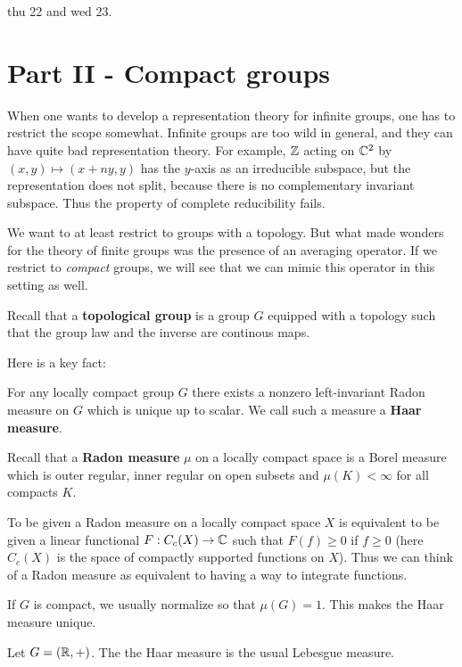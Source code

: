 \documentclass[11pt, english]{article}
\begin{document}
thu 22 and wed 23.


\newpage
\section{Part II - Compact groups}

When one wants to develop a representation theory for infinite groups, one has to restrict the scope somewhat. Infinite groups are too wild in general, and they can have quite bad representation theory. For example, $\mathbb{Z}$ acting on $\mathbb{C}^2$ by $(x,y) \mapsto (x+ny,y)$ has the $y$-axis as an irreducible subspace, but the representation does not split, because there is no complementary invariant subspace. Thus the property of complete reducibility fails. 

We want to at least restrict to groups with a topology. But what made wonders for the theory of finite groups was the presence of an averaging operator. If we restrict to \emph{compact} groups, we will see that we can mimic this operator in this setting as well.

Recall that a \textbf{topological group} is a group $G$ equipped with a topology such that the group law and the inverse are continous maps. 

Here is a key fact:
\begin{prop}
For any locally compact group $G$ there exists a nonzero left-invariant Radon measure on $G$ which is unique up to scalar. We call such a measure a \textbf{Haar measure}.  
\end{prop}

Recall that a \textbf{Radon measure} $\mu$ on a locally compact space is a Borel measure which is outer regular, inner regular on open subsets and $\mu(K) < \infty$ for all compacts $K$.

To be given a Radon measure on a locally compact space $X$ is equivalent to be given a linear functional $F:C_c(X) \to \mathbb{C}$ such that $F(f) \geq 0$ if $f \geq 0$ (here $C_c(X)$ is the space of compactly supported functions on $X$). Thus we can think of a Radon measure as equivalent to having a way to integrate functions.

If $G$ is compact, we usually normalize so that $\mu(G)=1$. This makes the Haar measure unique.

\begin{example}
  Let $G=(\mathbb{R},+)$. The the Haar measure is the usual Lebesgue measure.
\end{example}
\end{document}
